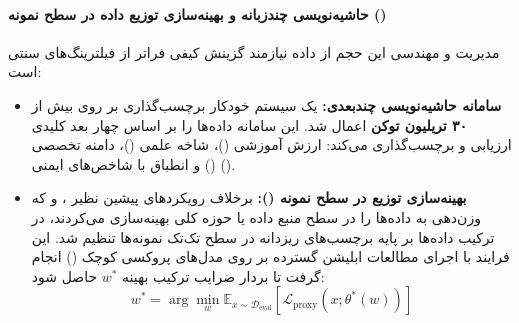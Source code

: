 \paragraph*{حاشیه‌نویسی چندزبانه و بهینه‌سازی توزیع داده در سطح نمونه ()}
مدیریت و مهندسی این حجم از داده نیازمند گزینش کیفی فراتر از فیلترینگ‌های سنتی است:
\begin{itemize}
    \item \textbf{سامانه حاشیه‌نویسی چندبعدی:} یک سیستم خودکار برچسب‌گذاری بر روی بیش از \textbf{۳۰ تریلیون توکن} اعمال شد. این سامانه داده‌ها را بر اساس چهار بعد کلیدی ارزیابی و برچسب‌گذاری می‌کند: ارزش آموزشی ()، شاخه علمی ()، دامنه تخصصی () و انطباق با شاخص‌های ایمنی ().
    \item \textbf{بهینه‌سازی توزیع در سطح نمونه ():} برخلاف رویکردهای پیشین نظیر  \cite{xie2023doremi}،  \cite{fan2023doge} و  \cite{liu2024regmix} که وزن‌دهی به داده‌ها را در سطح منبع داده یا حوزه کلی بهینه‌سازی می‌کردند، در  ترکیب داده‌ها بر پایه برچسب‌های ریزدانه در سطح تک‌تک نمونه‌ها تنظیم شد. این فرایند با اجرای مطالعات ابلیشن گسترده بر روی مدل‌های پروکسی کوچک () انجام گرفت تا بردار ضرایب ترکیب بهینه $w^*$ حاصل شود:
    \begin{equation}
        w^* = \arg\min_{w} \mathbb{E}_{x \sim \mathcal{D}_{\text{eval}}} \left[ \mathcal{L}_{\text{proxy}}(x; \theta^*(w)) \right]
    \end{equation}
\end{itemize}

